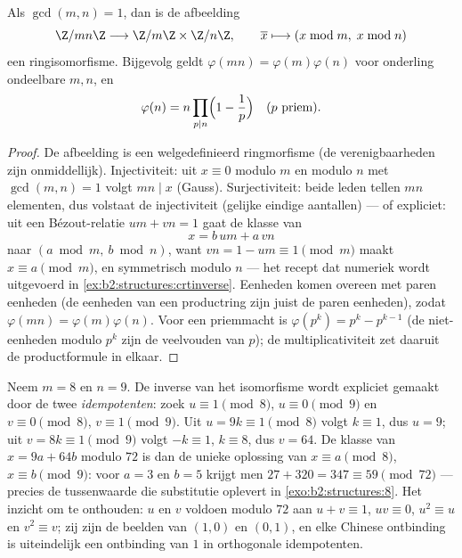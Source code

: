 \begin{theorem}\label{thm:b2:structures:crt}
Als $\gcd(m, n) = 1$, dan is de afbeelding
\[
\Z/mn\Z \longrightarrow \Z/m\Z \times \Z/n\Z,
\qquad
\overline{x} \longmapsto (x \bmod m,\; x \bmod n)
\]
een ringisomorfisme. Bijgevolg geldt
$\varphi(mn) = \varphi(m)\varphi(n)$ voor onderling ondeelbare $m,
n$, en
\[
\varphi(n) = n \prod_{p \mid n} \Bigl(1 - \frac 1p\Bigr)
\quad (p \text{ priem}).
\]
\end{theorem}

\begin{proof}
De afbeelding is een welgedefinieerd ringmorfisme (de
verenigbaarheden zijn onmiddellijk). Injectiviteit: uit $x \equiv
0$ modulo $m$ en modulo $n$ met $\gcd(m,n) = 1$ volgt $mn \mid x$
(Gauss). Surjectiviteit: beide leden tellen $mn$ elementen, dus
volstaat de injectiviteit (gelijke eindige aantallen) --- of
expliciet: uit een Bézout-relatie $um + vn = 1$ gaat de klasse van
\[
x = b\,um + a\,vn
\]
naar $(a \bmod m,\ b \bmod n)$, want $vn = 1 - um \equiv 1
\pmod m$ maakt $x \equiv a \pmod m$, en symmetrisch modulo $n$
--- het recept dat numeriek wordt uitgevoerd in
\cref{ex:b2:structures:crtinverse}. Eenheden komen overeen met
paren eenheden (de eenheden van een productring zijn juist de
paren eenheden), zodat $\varphi(mn) = \varphi(m)\varphi(n)$. Voor
een priemmacht is $\varphi(p^k) = p^k - p^{k-1}$ (de
niet-eenheden modulo $p^k$ zijn de veelvouden van $p$); de
multiplicativiteit zet daaruit de productformule in elkaar.
\end{proof}

\begin{example}\label{ex:b2:structures:crtinverse}
Neem $m = 8$ en $n = 9$. De inverse van het isomorfisme wordt
expliciet gemaakt door de twee \emph{idempotenten}: zoek $u \equiv
1 \pmod 8$, $u \equiv 0 \pmod 9$ en $v \equiv 0 \pmod 8$, $v
\equiv 1 \pmod 9$. Uit $u = 9k \equiv 1 \pmod 8$ volgt $k \equiv
1$, dus $u = 9$; uit $v = 8k \equiv 1 \pmod 9$ volgt $-k \equiv
1$, $k \equiv 8$, dus $v = 64$. De klasse van $x = 9a + 64b$
modulo $72$ is dan de unieke oplossing van $x \equiv a \pmod 8$,
$x \equiv b \pmod 9$: voor $a = 3$ en $b = 5$ krijgt men $27 +
320 = 347 \equiv 59 \pmod{72}$ --- precies de tussenwaarde die
substitutie oplevert in \cref{exo:b2:structures:8}. Het inzicht
om te onthouden: $u$ en $v$ voldoen modulo $72$ aan $u + v \equiv
1$, $uv \equiv 0$, $u^2 \equiv u$ en $v^2 \equiv v$; zij zijn de
beelden van $(1, 0)$ en $(0, 1)$, en elke Chinese ontbinding is
uiteindelijk een ontbinding van $1$ in orthogonale idempotenten.
\end{example}

